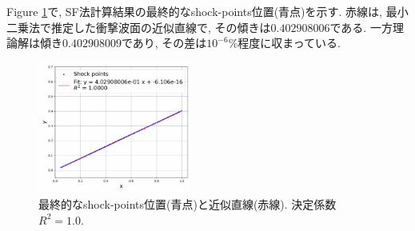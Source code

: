 \documentclass[a4j]{jarticle}
\begin{document}
Figure \ref{fig:2Ddiagapprox}で, SF法計算結果の最終的なshock-points位置(青点)を示す.
赤線は, 最小二乗法で推定した衝撃波面の近似直線で, その傾きは$0.402908006$である.
一方理論解は傾き$0.402908009$であり, その差は$10^{-6}$\%程度に収まっている.
\begin{figure}[h]
    \centering
    \includegraphics[width=0.45\textwidth]{shock_point_approx.pdf}
    \caption{最終的なshock-points位置(青点)と近似直線(赤線). 決定係数$R^2=1.0$.}
    \label{fig:2Ddiagapprox}
\end{figure}
\end{document}
